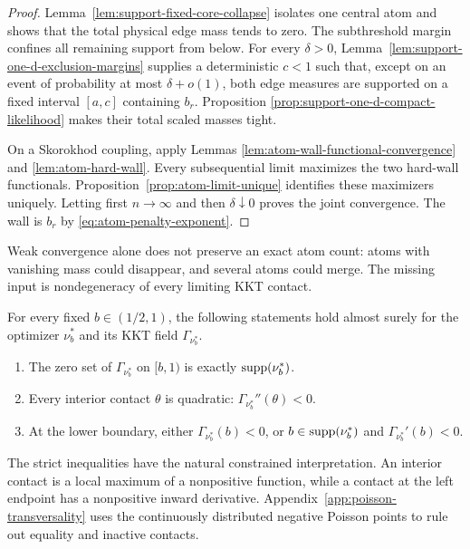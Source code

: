 \begin{proof}
Lemma~\ref{lem:support-fixed-core-collapse} isolates one central atom and
shows that the total physical edge mass tends to zero. The subthreshold
margin confines all remaining support from below. For every \(\delta>0\),
Lemma~\ref{lem:support-one-d-exclusion-margins} supplies a deterministic
\(c<1\) such that, except on an event of probability at most
\(\delta+o(1)\), both edge measures are supported on a fixed interval
\([a,c]\) containing \(b_r\). Proposition
\ref{prop:support-one-d-compact-likelihood} makes their total scaled masses
tight.

On a Skorokhod coupling, apply Lemmas
\ref{lem:atom-wall-functional-convergence} and
\ref{lem:atom-hard-wall}. Every subsequential limit maximizes the two
hard-wall functionals. Proposition~\ref{prop:atom-limit-unique} identifies
these maximizers uniquely. Letting first \(n\to\infty\) and then
\(\delta\downarrow0\) proves the joint convergence. The wall is \(b_r\) by
\eqref{eq:atom-penalty-exponent}.
\end{proof}

Weak convergence alone does not preserve an exact atom count: atoms with
vanishing mass could disappear, and several atoms could merge. The missing
input is nondegeneracy of every limiting KKT contact.
\begin{proposition}
\label{prop:atom-morse}
For every fixed \(b\in(1/2,1)\), the following statements hold almost surely
for the optimizer \(\nu_b^*\) and its KKT field \(\Gamma_{\nu_b^*}\).
\begin{enumerate}
\item The zero set of \(\Gamma_{\nu_b^*}\) on \([b,1)\) is exactly
      \(\operatorname{supp}(\nu_b^*)\).
\item Every interior contact \(\theta\) is quadratic:
      \(\Gamma_{\nu_b^*}''(\theta)<0\).
\item At the lower boundary, either \(\Gamma_{\nu_b^*}(b)<0\), or
      \(b\in\operatorname{supp}(\nu_b^*)\) and
      \(\Gamma_{\nu_b^*}'(b)<0\).
\end{enumerate}
\end{proposition}

The strict inequalities have the natural constrained interpretation. An
interior contact is a local maximum of a nonpositive function, while a
contact at the left endpoint has a nonpositive inward derivative.
Appendix~\ref{app:poisson-transversality} uses the continuously distributed
negative Poisson points to rule out equality and inactive contacts.

